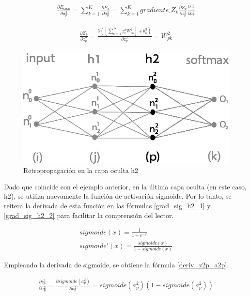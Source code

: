 \begin{gather}
	\frac{\partial E_{total}}{\partial a^2_p} = \sum_{k=1}^K \frac{\partial E_k}{\partial a^2_p} = \sum_{k=1}^K  gradiente\_Z_k   \frac{\partial Z_k}{\partial z^2_p}   \frac{\partial z^2_p}{\partial a^2_p}
	\label{E_total_a2p}
\end{gather}

\begin{gather}
	\frac{\partial Z_k}{\partial z^2_p} = \frac{\partial( [\sum_{c=1}^{P} z^2_c   W^2_{ck}] + b^3_k)}{\partial z^2_p} = W^2_{pk}
	\label{deriv_Zk_z2p}
\end{gather}

\begin{figure}[H]
	\centering
	\includegraphics[scale=0.35]{imagenes/nn_2_capa_h2.jpg}  
	\caption{Retropropagación en la capa oculta h2}
	\label{fig:nn_2_capa_h2}
\end{figure}

Dado que coincide con el ejemplo anterior, en la última capa oculta (en este caso, h2), se utiliza nuevamente la función de activación sigmoide. Por lo tanto, se reitera la derivada de esta función en las fórmulas \ref{grad_sig_h2_1} y \ref{grad_sig_h2_2} para facilitar la comprensión del lector.

\begin{gather}
	sigmoide(x) = \frac{1}{1+e^{-x}} \label{grad_sig_h2_1} \\
	sigmoide'(x) = \frac{sigmoide(x)}{1-sigmoide(x)} \label{grad_sig_h2_2}
\end{gather}


Empleando la derivada de sigmoide, se obtiene la fórmula \ref{deriv_z2p_a2p}.

\begin{gather}
	\frac{\partial z^2_ p}{\partial a^2_p} = \frac{\partial sigmoide(a^2_p)}{\partial a^2_p} = sigmoide(a^2_p) (1-sigmoide(a^2_p))
	\label{deriv_z2p_a2p}
\end{gather}

